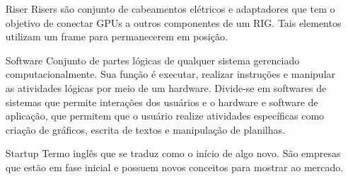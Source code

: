 \begin{center}
\begin{itemize}
		\item[Riser] Risers são conjunto de cabeamentos elétricos e adaptadores que tem o objetivo de conectar GPUs a outros componentes de um RIG. Tais elementos utilizam um frame para permanecerem em posição.  
		
		\item[Software] Conjunto de partes lógicas de qualquer sistema gerenciado computacionalmente.	Sua função é executar, realizar instruções e manipular as atividades lógicas por meio de um hardware. Divide-se em softwares de sistemas que permite interações dos usuários e o hardware e software de aplicação, que permitem que o usuário realize atividades específicas como criação de gráficos, escrita de textos e manipulação de planilhas.
		
		\item[Startup] Termo inglês que se traduz como o início de algo novo. São empresas que estão em fase inicial e possuem novos conceitos para mostrar ao mercado.
		
	\end{itemize}
	
\end{center}





